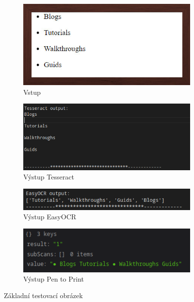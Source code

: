 \documentclass[journal]{IEEEtran}
\begin{document}
\begin{figure}

\begin{subfigure}{\linewidth}
        \centering
        \includegraphics[width=\linewidth]{Images/Test.jpg}
        \caption{Vstup}
        \label{fig:Test}
\end{subfigure}

\begin{subfigure}{\linewidth}
        \centering
        \includegraphics[width=\linewidth]{Images/Tesseract_Test.png}
        \caption{Výstup Tesseract}
        \label{fig:Tesseract_Test}
\end{subfigure}

\begin{subfigure}{\linewidth}
        \centering
        \includegraphics[width=\linewidth]{Images/easyOCR_Test.png}
        \caption{Výstup EasyOCR}
        \label{fig:easyOCR_Test}
\end{subfigure}

\begin{subfigure}{\linewidth}
        \centering
        \includegraphics[width=\linewidth]{Images/penToPrint_Test.png}
        \caption{Výstup Pen to Print}
        \label{fig:penToPrint_Test}
\end{subfigure}
\caption{Základní testovací obrázek}

\end{figure}
\end{document}
